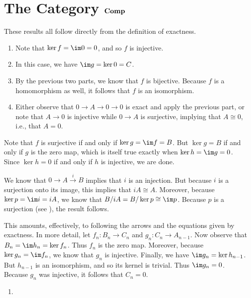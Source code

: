 \documentclass[../../solutions.tex]{subfiles}
\begin{document}
\section{\texorpdfstring{The Category $\textbf{Comp}$}{The Category Comp}}
\begin{exercise} \leavevmode
These results all follow directly from the definition of exactness. 
\begin{enumerate}
\item Note that $\ker f=\im 0=0$, and so $f$ is injective. 
\item In this case, we have $\im g=\ker0=C$. 
\item By the previous two parts, we know that $f$ is bijective. 
Because $f$ is a homomorphism as well, it follows that $f$ is an isomorphism. 
\item Either observe that $0\to A\to0\to0$ is exact and apply the previous part, or note that $A\to0$ is injective while $0\to A$ is surjective, implying that $A\cong0$, i.e., that $A=0$. 
\end{enumerate}
\end{exercise}

\begin{exercise} \leavevmode
Note that $f$ is surjective if and only if $\ker g=\im f=B$. 
But $\ker g=B$ if and only if $g$ is the zero map, which is itself true exactly when $\ker h=\im g=0$. 
Since $\ker h=0$ if and only if $h$ is injective, we are done. 
\end{exercise}

\begin{exercise} \leavevmode
We know that $0\to A\xrightarrow{i}B$ implies that $i$ is an injection. 
But because $i$ is a surjection onto its image, this implies that $iA\cong A$. 
Moreover, because $\ker p=\im i=iA$, we know that $B/iA=B/\ker p\cong\im p$. 
Because $p$ is a surjection (see ), the result follows. 
\end{exercise}

\begin{exercise} \leavevmode
This amounts, effectively, to following the arrows and the equations given by exactness. 
In more detail, let $f_n:B_n\to C_n$ and $g_n:C_n\to A_{n-1}$. 
Now observe that $B_n=\im h_n=\ker f_n$. 
Thus $f_n$ is the zero map. 
Moreover, because $\ker g_n=\im f_n$, we know that $g_n$ is injective. 
Finally, we have $\im g_n=\ker h_{n-1}$. 
But $h_{n-1}$ is an isomorphism, and so its kernel is trivial. 
Thus $\im g_n=0$. 
Because $g_n$ was injective, it follows that $C_n=0$. 
\end{exercise}

\begin{exercise} \leavevmode
\begin{enumerate}
\item 
\end{enumerate}
\end{exercise}
\end{document}
